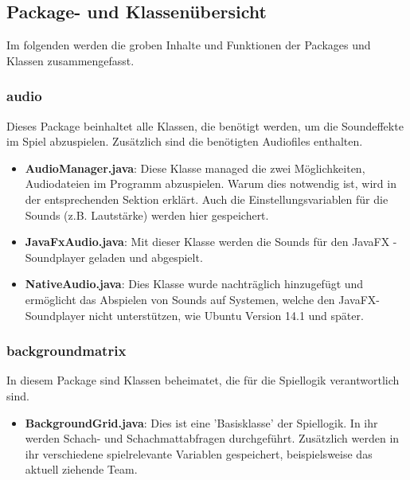 \documentclass[12pt,a4paper]{article}
\begin{document}
{\newpage
\subsection{Package- und Klassenübersicht}
\label{SUBSEC:PACKAGE}

Im folgenden werden die groben Inhalte und Funktionen der Packages und Klassen zusammengefasst.\

\subsubsection{audio}

Dieses Package beinhaltet alle Klassen, die benötigt werden, um die Soundeffekte im Spiel abzuspielen. Zusätzlich sind die benötigten Audiofiles enthalten.\

\begin{itemize}
	\item{\textbf{AudioManager.java}: Diese Klasse managed die zwei Möglichkeiten, Audiodateien im Programm abzuspielen. Warum dies notwendig ist, wird in der entsprechenden Sektion erklärt. %
Auch die Einstellungsvariablen für die Sounds (z.B. Lautstärke) werden hier gespeichert. }
	
	\item{\textbf{JavaFxAudio.java}: Mit dieser Klasse werden die Sounds für den JavaFX - Soundplayer geladen und abgespielt. }	
	
	\item{\textbf{NativeAudio.java}: Dies Klasse wurde nachträglich hinzugefügt und ermöglicht das Abspielen von Sounds auf Systemen, welche den JavaFX-Soundplayer nicht unterstützen, wie Ubuntu Version 14.1 und später.}
	
\end{itemize}

\subsubsection{backgroundmatrix}

In diesem Package sind Klassen beheimatet, die für die Spiellogik verantwortlich sind.

\begin{itemize}
	\item{\textbf{BackgroundGrid.java}: Dies ist eine 'Basisklasse' der Spiellogik. In ihr werden Schach- und Schachmattabfragen durchgeführt. Zusätzlich werden in ihr verschiedene spielrelevante Variablen gespeichert, beispielsweise das aktuell ziehende Team.}
	

\end{itemize}}
\end{document}
